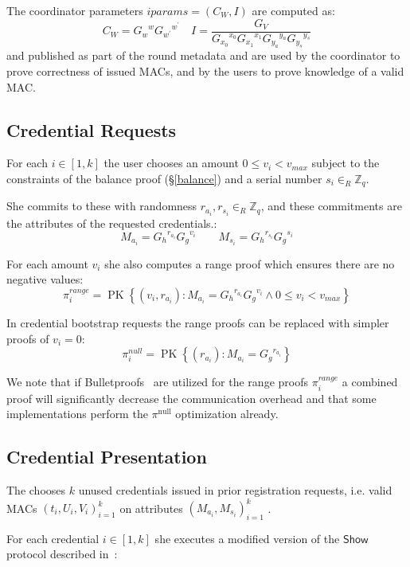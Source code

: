 \documentclass{article}
\begin{document}
The coordinator parameters
$\mathit{iparams} =  (C_{W}, I)$
are computed as:
\[
C_{W}={G_w}^{w} {G_{w^\prime}}^{w^\prime}
\quad
I=\frac{G_{V}}{{G_{x_0}}^{x_0} {G_{x_1}}^{x_1} {G_{y_a}}^{y_a} {G_{y_s}}^{y_s}}
\]
and published as part of the round metadata and are used by the coordinator to prove correctness of issued MACs, and by the users to prove knowledge of a valid MAC.

\subsection{Credential Requests}

For each $i \in [1, k]$ the user chooses an amount $0 \leq v_i < v_{\mathit{max}}$ subject to the constraints of the balance proof (\S\ref{balance}) and a serial number $s_i \in_R \mathbb{Z}_q$.

She commits to these with randomness $r_{a_i}, r_{s_i} \in_R \mathbb{Z}_q$, and these commitments are the attributes of the requested credentials.:
\[ M_{a_i}={G_h}^{r_{a_i}}{G_g}^{v_i} \qquad M_{s_i}={G_h}^{r_{s_i}}{G_g}^{s_i} \]

For each amount $v_i$ she also computes a range proof which ensures there are no negative values:
\[
\pi^{\mathit{range}}_i = \operatorname{PK}\left\{\left(v_i, r_{a_i} \right) :
M_{a_i} = {G_h}^{r_{a_i}}{G_g}^{v_i}
\land
0 \leq v_i < v_{\mathit{max}} \right\}
\]

In credential bootstrap requests the range proofs can be replaced with simpler proofs of $v_i = 0$:
\[
  \pi^{\mathit{null}}_i = \operatorname{PK}\left\{ \left( r_{a_i}\right) :
    M_{a_i} = {G_{g}}^{r_{a_i}}
  \right\}
\]

We note that if Bulletproofs~\cite{bunz2018bulletproofs} are utilized for the range proofs $\pi^{\textit{range}}_i$ a combined proof will significantly decrease the communication overhead and that some implementations perform the $\pi^{\mathrm{null}}$ optimization already.

\subsection{Credential Presentation}

The chooses $k$ unused credentials issued in prior registration requests, i.e. valid MACs $(t_i,U_i,V_i)_{i=1}^k$ on attributes $(M_{a_i}, M_{s_i})_{i=1}^k$ .

For each credential $i \in [1, k]$ she executes a modified version of the $\mathsf{Show}$ protocol described in~\cite{chase2019signal}:
\end{document}
